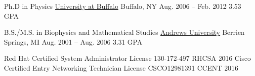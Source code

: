 

\begin{cventries}
  \cventry
    {Ph.D in Physics}                                  %
    {\href{www.buffalo.edu}{University at Buffalo}}    %
    {Buffalo, NY}                                      %
    {Aug. 2006 -- Feb. 2012}                           %
    {3.53 GPA} 		                               %


  \cventry
    {B.S./M.S. in Biophysics and Mathematical Studies} %
    {\href{www.andrews.edu}{Andrews University}}       %
    {Berrien Springs, MI}                              %
    {Aug. 2001 -- Aug. 2006}                           %
    {3.31 GPA}                                         %

\end{cventries}

\begin{cvhonors}
    \cvhonor
    {Red Hat Certified System Administrator}
    {License 130-172-497}
    {RHCSA}
    {2016}
  \cvhonor
    {Cisco Certified Entry Networking Technician}
    {License CSCO12981391}
    {CCENT}
    {2016}
\end{cvhonors}



